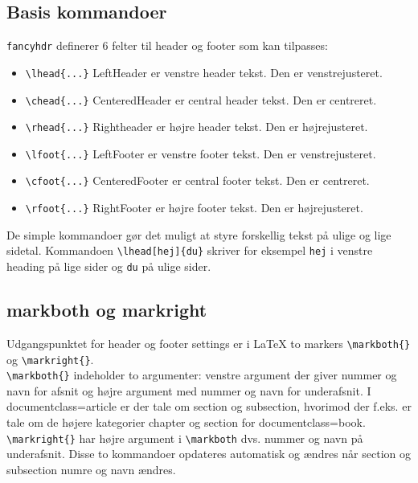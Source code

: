 \documentclass{article}
\begin{document}
\subsection{Basis kommandoer}

\verb"fancyhdr" definerer 6 felter til header og footer som kan tilpasses:
\begin{itemize}
\item \verb"\lhead{...}" LeftHeader er venstre header tekst. Den er venstrejusteret.
\item \verb"\chead{...}" CenteredHeader er central header tekst. Den er centreret. 
\item \verb"\rhead{...}" Rightheader er højre header tekst. Den er højrejusteret.
\item \verb"\lfoot{...}" LeftFooter er venstre footer tekst. Den er venstrejusteret.
\item \verb"\cfoot{...}" CenteredFooter er central footer tekst. Den er centreret. 
\item \verb"\rfoot{...}" RightFooter er højre footer tekst. Den er højrejusteret.
\end{itemize}
De simple kommandoer gør det muligt at styre forskellig tekst på ulige og lige sidetal. Kommandoen \verb"\lhead[hej]{du}" skriver for eksempel \verb"hej" i venstre heading på lige sider og \verb"du" på ulige sider. 

\subsection{markboth og markright}
Udgangspunktet for header og footer settings er i \LaTeX{} to markers \verb"\markboth{}" og \verb"\markright{}".\\
\verb"\markboth{}" indeholder to argumenter: venstre argument der giver nummer og navn for afsnit og højre argument med nummer og navn for underafsnit. I documentclass=article er der tale om section og subsection, hvorimod der f.eks. er tale om de højere kategorier chapter og section for documentclass=book.
\verb"\markright{}" har højre argument i \verb"\markboth" dvs. nummer og navn på underafsnit. Disse to kommandoer opdateres automatisk og ændres når section og subsection numre og navn ændres. 
\end{document}
